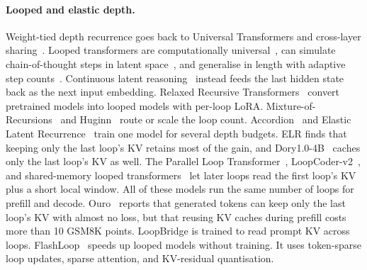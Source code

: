 \documentclass[11pt]{article}
\begin{document}
\paragraph{Looped and elastic depth.} Weight-tied depth recurrence goes back to Universal Transformers and cross-layer
sharing~\citep{ut,albert}. Looped transformers are computationally universal~\citep{giannou2023looped}, can simulate chain-of-thought
steps in latent space~\citep{saunshi2025latent}, and generalise in length with adaptive step
counts~\citep{loopedlengthgen}. Continuous latent reasoning~\citep{coconut} instead feeds the last hidden
state back as the next input embedding. Relaxed Recursive Transformers~\citep{relaxedrecursive} convert pretrained models into looped
models with per-loop LoRA. Mixture-of-Recursions~\citep{mor} and Huginn~\citep{huginn} route or scale the loop count.
Accordion~\citep{accordion} and Elastic Latent Recurrence~\citep{elr} train one model for several depth budgets. ELR
finds that keeping only the last loop's KV retains most of the gain, and Dory1.0-4B~\citep{dory} caches only the last
loop's KV as well. The Parallel Loop Transformer~\citep{plt}, LoopCoder-v2~\citep{loopcoder2}, and shared-memory looped
transformers~\citep{sharedmem} let later loops read the first loop's KV plus a short local window. All of these models
run the same number of loops for prefill and decode. Ouro~\citep{ouro} reports that generated tokens can keep
only the last loop's KV with almost no loss, but that reusing KV caches during prefill costs more than 10 GSM8K
points. LoopBridge is trained to read prompt KV across
loops. FlashLoop~\citep{flashloop} speeds up looped models without training. It uses token-sparse loop updates, sparse
attention, and KV-residual quantisation.
\end{document}
